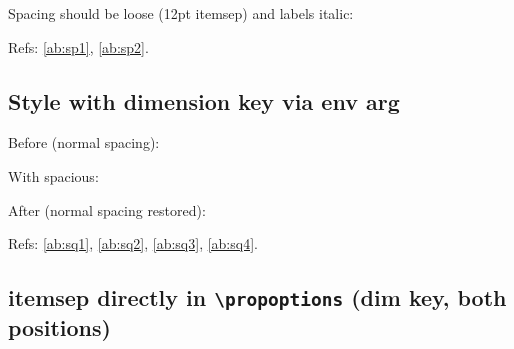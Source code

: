 \documentclass{article}
\begin{document}

Spacing should be loose (12pt itemsep) and labels italic:
\begin{prop}
  \item \label{ab:sp1}
  \item \label{ab:sp2}
\end{prop}


Refs: \ref{ab:sp1}, \ref{ab:sp2}.

\subsection{Style with dimension key via env arg}


Before (normal spacing):
\begin{prop}
  \item \label{ab:sq1}
\end{prop}

With spacious:
\begin{prop}[style=spacious]
  \item \label{ab:sq2}
  \item \label{ab:sq3}
\end{prop}

After (normal spacing restored):
\begin{prop}
  \item \label{ab:sq4}
\end{prop}

Refs: \ref{ab:sq1}, \ref{ab:sq2}, \ref{ab:sq3}, \ref{ab:sq4}.

\subsection{itemsep directly in \texttt{\textbackslash propoptions} (dim key,
  both positions)}


\end{document}
